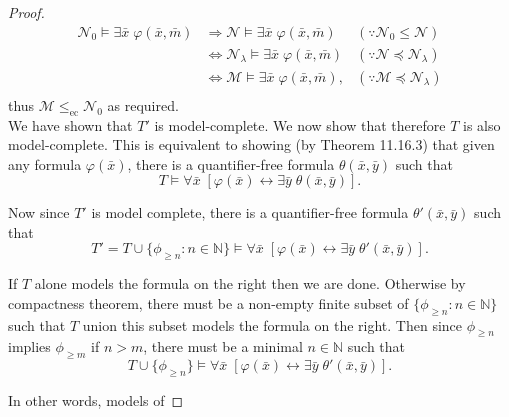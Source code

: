 \documentclass{article}
\begin{document}
\begin{enumerate}[label={\bf Q\arabic*:}]
\begin{proof}
      \begin{align*}
        \mathcal{N}_0\models \exists\bar{x}\; \varphi(\bar{x},\bar{m})
          &\Rightarrow\mathcal{N}\models \exists\bar{x}\;
          \varphi(\bar{x},\bar{m}) &(\because \mathcal{N}_0\leq\mathcal{N})
          \\
          &\Leftrightarrow\mathcal{N}_\lambda\models \exists\bar{x}\;
            \varphi(\bar{x},\bar{m}) &(\because
            \mathcal{N}\preceq\mathcal{N}_\lambda) \\
          &\Leftrightarrow\mathcal{M}\models \exists\bar{x}\;
            \varphi(\bar{x},\bar{m}), &(\because
            \mathcal{M}\preceq\mathcal{N}_\lambda) \\
      \end{align*}
      thus $\mathcal{M}\leq_{\text{ec}}\mathcal{N}_0$ as required. \\

      We have shown that $T'$ is model-complete. We now show that therefore
      $T$ is also model-complete. This is equivalent to showing (by Theorem
      11.16.3) that given any formula $\varphi(\bar{x})$, there is a
      quantifier-free formula $\theta(\bar{x},\bar{y})$ such that
      \[T\models \forall\bar{x}\; [\varphi(\bar{x})\leftrightarrow
        \exists\bar{y}\; \theta(\bar{x},\bar{y})].\]

      Now since $T'$ is model complete, there is a quantifier-free formula
      $\theta'(\bar{x},\bar{y})$ such that
      \[T'= T\cup\{\phi_{\geq n}:n\in\mathbb{N}\} \models
      \forall\bar{x}\; [\varphi(\bar{x})\leftrightarrow \exists\bar{y}\;
      \theta'(\bar{x},\bar{y})].\]

      If $T$ alone models the formula on the right then we are done.
      Otherwise by compactness theorem, there must be a non-empty finite
      subset of $\{\phi_{\geq n}:n\in\mathbb{N}\}$ such that $T$ union this
      subset models the formula on the right. Then since $\phi_{\geq n}$
      implies $\phi_{\geq m}$ if $n>m$, there must be a minimal
      $n\in\mathbb{N}$ such that
      \[T\cup\{\phi_{\geq n}\} \models \forall\bar{x}\;
      [\varphi(\bar{x})\leftrightarrow \exists\bar{y}\;
      \theta'(\bar{x},\bar{y})].\]

      In other words, models of

    \end{proof}


\end{enumerate}
\end{document}
